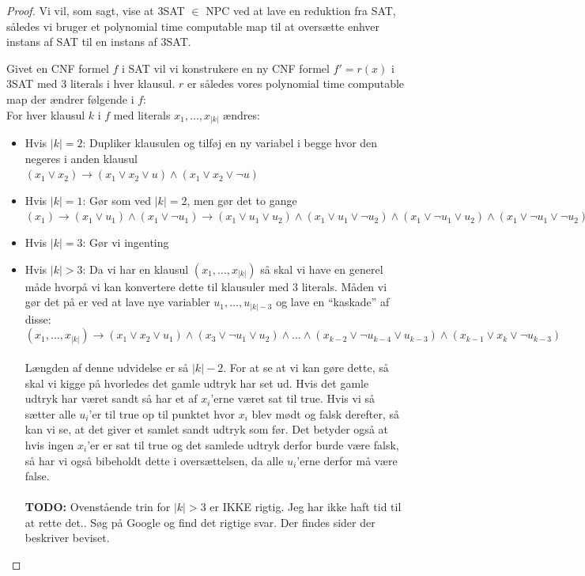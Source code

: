 \begin{proof}
 Vi vil, som sagt, vise at 3SAT $\in$ NPC ved at lave en reduktion fra SAT,
 således vi bruger et polynomial time computable map til at oversætte enhver
 instans af SAT til en instans af 3SAT. 

Givet en CNF formel $f$ i SAT vil vi konstrukere en ny CNF formel $f' = r(x)$ i
3SAT med 3 literals i hver klausul. $r$ er således vores polynomial time
computable map der ændrer følgende i $f$:\\

For hver klausul $k$ i $f$ med literals $x_1, \hdots, x_{|k|}$ ændres:
\begin{itemize}
 \item Hvis $|k| = 2$: Dupliker klausulen og tilføj en ny variabel i begge hvor
	 den negeres i anden klausul \\
      $(x_1 \vee x_2) \rightarrow (x_1 \vee x_2 \vee u) \wedge (x_1 \vee x_2 \vee \neg u)$
 \item Hvis $|k| = 1$: Gør som ved $|k| = 2$, men gør det to gange \\
	  $(x_1) \rightarrow (x_1 \vee u_1) \wedge (x_1 \vee \neg u_1) \rightarrow
	  (x_1 \vee u_1 \vee u_2) \wedge (x_1 \vee u_1 \vee \neg u_2) \wedge (x_1
	  \vee \neg u_1 \vee u_2) \wedge (x_1 \vee \neg u_1 \vee \neg u_2)$
 \item Hvis $|k| = 3$: Gør vi ingenting
 \item Hvis $|k| > 3$: Da vi har en klausul $(x_1,\hdots,x_{|k|})$ så skal vi
	 have en generel måde hvorpå vi kan konvertere dette til klausuler med 3
	 literals. Måden vi gør det på er ved at lave nye variabler
	 $u_1,\hdots,u_{|k|-3}$ og lave en ``kaskade'' af disse:\\
	  $(x_1,\hdots,x_{|k|}) \rightarrow (x_1 \vee x_2 \vee u_1) \wedge (x_3
	  \vee \neg u_1 \vee u_2) \wedge \hdots \wedge (x_{k-2} \vee \neg u_{k-4}
	  \vee u_{k-3}) \wedge (x_{k-1} \vee x_k \vee \neg u_{k-3})$ \\
      ~\\
      Længden af denne udvidelse er så $|k|-2$.
	  For at se at vi kan gøre dette, så skal vi kigge på hvorledes det gamle
	  udtryk har set ud. Hvis det gamle udtryk har været sandt så har et af
	  $x_i$'erne været sat til true. Hvis vi så sætter alle $u_i$'er til true
	  op til punktet hvor $x_i$ blev mødt og falsk derefter, så kan vi se, at
	  det giver et samlet sandt udtryk som før. Det betyder også at hvis ingen
	  $x_i$'er er sat til true og det samlede udtryk derfor burde være falsk,
	  så har vi også bibeholdt dette i oversættelsen, da alle $u_i$'erne derfor
	  må være false.\\
      ~\\
	  \textbf{TODO:} Ovenstående trin for $|k| > 3$ er IKKE rigtig. Jeg har
	  ikke haft tid til at rette det.. Søg på Google og find det rigtige svar.
	  Der findes sider der beskriver beviset.
\end{itemize}


\end{proof}
